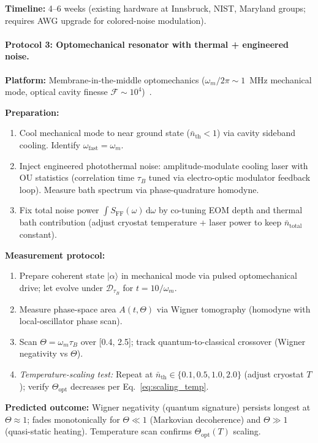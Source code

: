 \documentclass[11pt,letterpaper]{article}
\begin{document}
\textbf{Timeline:} 4--6 weeks (existing hardware at Innsbruck, NIST,
Maryland groups; requires AWG upgrade for colored-noise modulation).

\paragraph{Protocol 3: Optomechanical resonator with thermal + engineered noise.}
\textbf{Platform:} Membrane-in-the-middle optomechanics
($\omega_m/2\pi\sim 1$~MHz mechanical mode, optical cavity finesse
$\mathcal{F}\sim 10^4$)~\cite{oconnell2010}.

\textbf{Preparation:}
\begin{enumerate}[nosep,leftmargin=*]
\item Cool mechanical mode to near ground state ($\bar n_{\text{th}}<1$)
via cavity sideband cooling. Identify $\omega_{\mathrm{fast}}=\omega_m$.
\item Inject engineered photothermal noise: amplitude-modulate cooling
laser with OU statistics (correlation time $\tau_B$ tuned via
electro-optic modulator feedback loop). Measure bath spectrum via
phase-quadrature homodyne.
\item Fix total noise power $\int S_{\text{FF}}(\omega)\,\mathrm{d}\omega$
by co-tuning EOM depth and thermal bath contribution (adjust cryostat
temperature + laser power to keep $\bar n_{\text{total}}$ constant).
\end{enumerate}

\textbf{Measurement protocol:}
\begin{enumerate}[nosep,leftmargin=*]
\item Prepare coherent state $|\alpha\rangle$ in mechanical mode via
pulsed optomechanical drive; let evolve under $\mathcal{D}_{\tau_B}$ for
$t=10/\omega_m$.
\item Measure phase-space area $A(t,\Theta)$ via Wigner tomography
(homodyne with local-oscillator phase scan).
\item Scan $\Theta=\omega_m\tau_B$ over [0.4, 2.5]; track quantum-to-classical
crossover (Wigner negativity vs $\Theta$).
\item \emph{Temperature-scaling test:} Repeat at $\bar n_{\text{th}}\in\{0.1,
0.5, 1.0, 2.0\}$ (adjust cryostat $T$); verify $\Theta_{\text{opt}}$
decreases per Eq.~\eqref{eq:scaling_temp}.
\end{enumerate}

\textbf{Predicted outcome:} Wigner negativity (quantum signature) persists
longest at $\Theta\approx 1$; fades monotonically for $\Theta\ll 1$
(Markovian decoherence) and $\Theta\gg 1$ (quasi-static heating). Temperature
scan confirms $\Theta_{\text{opt}}(T)$ scaling.
\end{document}

